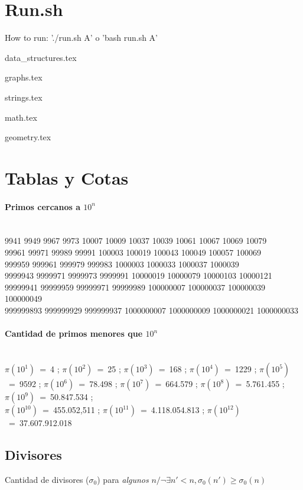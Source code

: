 \documentclass{article}
\newcommand\importmodule[1]{{#1.tex}}
\newcommand\kotlinfile[1]{}
\begin{document}
\begin{multicols*}{2}

\tableofcontents

\section{Run.sh}
\kotlinfile{../other/run.sh}

How to run: './run.sh A' o 'bash run.sh A'

\importmodule{data_structures}

\importmodule{graphs}

\importmodule{strings}

\importmodule{math}

\importmodule{geometry}

\section{Tablas y Cotas}
\paragraph{Primos cercanos a $10^n$}\ \\
9941 9949 9967 9973 10007 10009 10037 10039 10061 10067 10069 10079\\
99961 99971 99989 99991 100003 100019 100043 100049 100057 100069\\
999959 999961 999979 999983 1000003 1000033 1000037 1000039\\
9999943 9999971 9999973 9999991 10000019 10000079 10000103 10000121\\
99999941 99999959 99999971 99999989 100000007 100000037 100000039 100000049\\
999999893 999999929 999999937 1000000007 1000000009 1000000021 1000000033

\paragraph{Cantidad de primos menores que $10^n$}\ \\
$\pi(10^1)$~=~4 ;
$\pi(10^2)$~=~25 ;
$\pi(10^3)$~=~168 ;
$\pi(10^4)$~=~1229 ;
$\pi(10^5)$~=~9592 ;
$\pi(10^6)$~=~78.498 ;
$\pi(10^7)$~=~664.579 ;
$\pi(10^8)$~=~5.761.455 ;
$\pi(10^9)$~=~50.847.534 ;\\
$\pi(10^{10})$~=~455.052,511 ;
$\pi(10^{11})$~=~4.118.054.813 ;
$\pi(10^{12})$~=~37.607.912.018
%
%
%
\subsection{Divisores}
Cantidad de divisores ($\sigma_0$) para \emph{algunos} $n / \neg\exists n'<n, \sigma_0(n') \geqslant \sigma_0(n)$


\end{multicols*}
\end{document}
